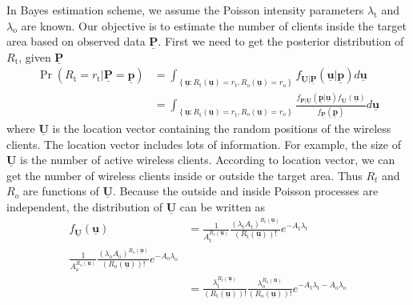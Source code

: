 In Bayes estimation scheme, we assume the Poisson intensity parameters $\lambda_{\mathrm{t}}$ and $\lambda_{\mathrm{o}}$ are known. Our objective is to estimate the number of clients inside the target area based on observed data $\underline{\mathbf{P}}$. First we need to get the posterior distribution of $R_{\mathrm{t}}$, given $\underline{\mathbf{P}}$
\begin{equation} \label{equation:PosdistRt}
\begin{split}
\Pr \left( R_{\mathrm{t}} = r_{\mathrm{t}}
| \underline{\mathbf{P}} = \underline{\mathbf{p}} \right)
&= \int_{ \left\{ \underline{\mathbf{u}}
	: R_{\mathrm{t}}(\underline{\mathbf{u}}) = r_{\mathrm{t}},
	R_{\mathrm{o}}(\underline{\mathbf{u}}) = r_{\mathrm{o}}
	\right\} }
f_{\underline{\mathbf{U}} | \underline{\mathbf{P}}}
\left( \underline{\mathbf{u}} | \underline{\mathbf{p}} \right)
d\underline{\mathbf{u}} \\
&= \int_{ \left\{ \underline{\mathbf{u}}
	: R_{\mathrm{t}}(\underline{\mathbf{u}}) = r_{\mathrm{t}},
	R_{\mathrm{o}}(\underline{\mathbf{u}}) = r_{\mathrm{o}} \right\} }
\frac{ f_{\underline{\mathbf{P}} | \underline{\mathbf{U}}}
	\left( \underline{\mathbf{p}} | \underline{\mathbf{u}} \right)
	f_{\underline{\mathbf{U}}} (\underline{\mathbf{u}}) }
{ f_{\underline{\mathbf{P}}} \left( \underline{\mathbf{p}} \right) }
d\underline{\mathbf{u}} 
\end{split}
\end{equation}
where $\underline{\mathbf{U}}$ is the location vector containing the random positions of the wireless clients. The location vector includes lots of information. For example, the size of $\underline{\mathbf{U}}$ is the number of active wireless clients. According to location vector, we can get the number of wireless clients inside or outside the target area. Thus $R_{t}$ and $R_{o}$ are functions of $\underline{\mathbf{U}}$.
Because the outside and inside Poisson processes are independent, the distribution of $\underline{\mathbf{U}}$ can be written as
\begin{equation} \label{equation:distU}
\begin{split}
f_{\underline{\mathbf{U}}} ( \underline{\mathbf{u}} )
&= \frac{1}{A_{\mathrm{t}}^{R_{\mathrm{t}}(\underline{\mathbf{u}})}}
\frac{ ( \lambda_{\mathrm{t}}
	A_{\mathrm{t}} )^{R_{\mathrm{t}}(\underline{\mathbf{u}})} }
{ ( R_{\mathrm{t}}(\underline{\mathbf{u}}) )! }
e^{- A_{\mathrm{t}} \lambda_{\mathrm{t}}} \\
\frac{1}{A_{\mathrm{o}}^{R_{\mathrm{o}}(\underline{\mathbf{u}})}}
\frac{ ( \lambda_{\mathrm{o}}
	A_{\mathrm{o}} )^{R_{\mathrm{o}}(\underline{\mathbf{u}})} }
{ ( R_{\mathrm{o}}(\underline{\mathbf{u}}) )! }
e^{- A_{\mathrm{o}} \lambda_{\mathrm{o}}} \\
&= \frac{ \lambda_{\mathrm{t}}^{R_{\mathrm{t}}(\underline{\mathbf{u}})} }
{ ( R_{\mathrm{t}}(\underline{\mathbf{u}}) )! }
\frac{ \lambda_{\mathrm{o}}^{R_{\mathrm{o}}(\underline{\mathbf{u}})} }
{ ( R_{\mathrm{o}}(\underline{\mathbf{u}}) )! }
e^{- A_{\mathrm{t}} \lambda_{\mathrm{t}}
	- A_{\mathrm{o}} \lambda_{\mathrm{o}}} 
\end{split}
\end{equation}
